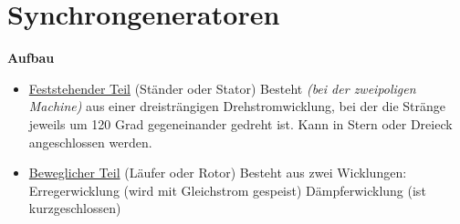 \section{Synchrongeneratoren}


\textbf{Aufbau}

\begin{itemize}
    \item \underline{Feststehender Teil} (Ständer oder Stator)
    \newline Besteht \textit{(bei der zweipoligen Machine)} aus einer dreisträngigen Drehstromwicklung, bei der die Stränge jeweils um 120 Grad gegeneinander gedreht ist. Kann in Stern oder Dreieck angeschlossen werden.
    \item \underline{Beweglicher Teil} (Läufer oder Rotor)
    \newline Besteht aus zwei Wicklungen:
    \subitem Erregerwicklung (wird mit Gleichstrom gespeist)
    \subitem Dämpferwicklung (ist kurzgeschlossen)
\end{itemize}
